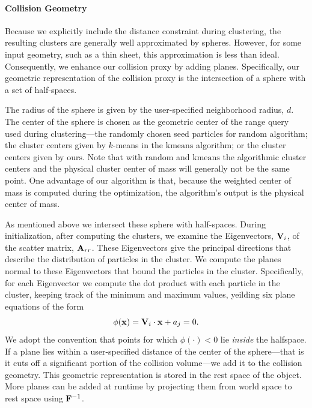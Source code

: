 \documentclass[review]{acmsiggraph}
\begin{document}
\paragraph{Collision Geometry}
Because we explicitly include the distance constraint during clustering, the resulting clusters are generally well approximated
by spheres.  However, for some input geometry, such as a thin sheet, this approximation is less than ideal.  Consequently,
we enhance our collision proxy by adding planes.  Specifically, our geometric representation of the collision proxy
is the intersection of a sphere with a set of half-spaces.

The radius of the sphere is given by the user-specified neighborhood radius, $d$.  The center of the sphere is chosen as the 
geometric center of the range query used during clustering---the randomly chosen seed particles for $\mathrm{random}$ algorithm;
the cluster centers given by $k$-means in the $\mathrm{kmeans}$ algorithm; or the cluster centers given by $\mathrm{ours}$.
Note that with $\mathrm{random}$ and $\mathrm{kmeans}$ the algorithmic cluster centers and the physical cluster center of mass will
generally not be the same point.  One advantage of our algorithm is that, because the weighted center of mass is computed during
the optimization, the algorithm's output is the physical center of mass.

As mentioned above we intersect these sphere with half-spaces.  During initialization, after computing the clusters, we examine the 
Eigenvectors, $\mathit{\mathbf{V}}_i$, of the scatter matrix, $\mathit{\mathbf{A}}_{rr}$.  These Eigenvectors give the principal directions that describe the distribution
of particles in the cluster.  We compute the planes normal to these Eigenvectors that bound the particles in the cluster.  Specifically,
for each Eigenvector we compute the dot product with each particle in the cluster, keeping track of the 
minimum and maximum values, yeilding six plane equations of the form
\begin{equation}
\phi(\mathit{\mathbf{x}}) = \mathit{\mathbf{V}}_i\cdot\mathit{\mathbf{x}} + a_j = 0.
\end{equation}
We adopt the convention that points for which $\phi(\cdot)<0$ lie {\em inside} the halfspace.  If a plane lies within a user-specified
distance of the center of the sphere---that is it cuts off a significant portion of the collision volume---we add it to the collision
geometry.  This geometric representation is stored in the rest space of the objcet.  More planes can be added at runtime by projecting
them from world space to rest space using $\mathit{\mathbf{F}}^{-1}$.
\end{document}
